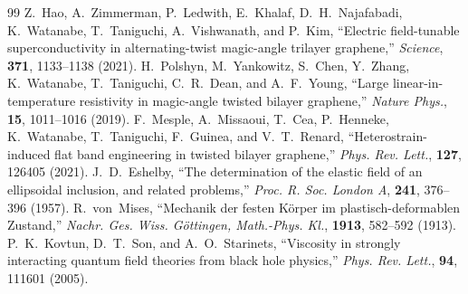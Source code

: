 \documentclass[12pt,a4paper]{article}
\begin{document}
\begin{thebibliography}{99}
 Z.~Hao, A.~Zimmerman, P.~Ledwith, E.~Khalaf, D.~H.~Najafabadi, K.~Watanabe, T.~Taniguchi, A.~Vishwanath, and P.~Kim, ``Electric field-tunable superconductivity in alternating-twist magic-angle trilayer graphene,'' \textit{Science}, \textbf{371}, 1133--1138 (2021).
 H.~Polshyn, M.~Yankowitz, S.~Chen, Y.~Zhang, K.~Watanabe, T.~Taniguchi, C.~R.~Dean, and A.~F.~Young, ``Large linear-in-temperature resistivity in magic-angle twisted bilayer graphene,'' \textit{Nature Phys.}, \textbf{15}, 1011--1016 (2019).
 F.~Mesple, A.~Missaoui, T.~Cea, P.~Henneke, K.~Watanabe, T.~Taniguchi, F.~Guinea, and V.~T.~Renard, ``Heterostrain-induced flat band engineering in twisted bilayer graphene,'' \textit{Phys. Rev. Lett.}, \textbf{127}, 126405 (2021).
 J.~D.~Eshelby, ``The determination of the elastic field of an ellipsoidal inclusion, and related problems,'' \textit{Proc. R. Soc. London A}, \textbf{241}, 376--396 (1957).
 R.~von~Mises, ``Mechanik der festen K{\"o}rper im plastisch-deformablen Zustand,'' \textit{Nachr. Ges. Wiss. G{\"o}ttingen, Math.-Phys. Kl.}, \textbf{1913}, 582--592 (1913).
 P.~K.~Kovtun, D.~T.~Son, and A.~O.~Starinets, ``Viscosity in strongly interacting quantum field theories from black hole physics,'' \textit{Phys. Rev. Lett.}, \textbf{94}, 111601 (2005).
\end{thebibliography}
												
\end{document}
